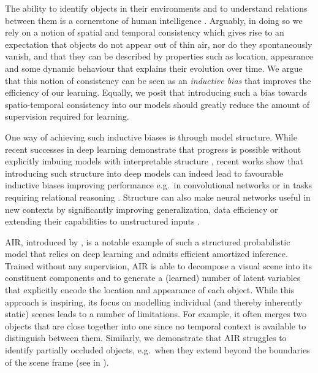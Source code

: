 \label{sec:sqair_intro}

The ability to identify objects in their environments and to understand relations between them is a cornerstone of human intelligence \citep{Kemp2008discovery}. Arguably, in doing so we rely on a notion of spatial and temporal consistency which gives rise to an expectation that objects do not appear out of thin air, nor do they spontaneously vanish, and that they can be described by properties such as location, appearance and some dynamic behaviour that explains their evolution over time. We argue that this notion of consistency can be seen as an \textit{inductive bias} that improves the efficiency of our learning. Equally, we posit that introducing such a bias towards spatio-temporal consistency into our models should greatly reduce the amount of supervision required for learning.

One way of achieving such inductive biases is through model structure. 
While recent successes in deep learning demonstrate that progress is possible without explicitly imbuing models with interpretable structure \citep{Lecun2015deep}, recent works show that introducing such structure into deep models can indeed lead to favourable inductive biases improving performance  e.g.\ in convolutional networks \citep{Lecun1989backpropagation} or in tasks requiring relational reasoning \citep{Santoro2017}.
Structure can also make neural networks useful in new contexts by significantly improving generalization, data efficiency \citep{Jacobsen2016struc} or extending their capabilities to unstructured inputs \citep{Graves2016dnc}.

\gls{AIR}, introduced by \cite{Eslami2016air}, is a notable example of such a structured probabilistic model that relies on deep learning and admits efficient amortized inference.
Trained without any supervision, \gls{AIR} is able to decompose a visual scene into its constituent components and to generate a (learned) number of latent variables that explicitly encode the location and appearance of each object. While this approach is inspiring, its focus on modelling individual (and thereby inherently static) scenes leads to a number of limitations. For example, it often merges two objects that are close together into one since no temporal context is available to distinguish between them. Similarly, we demonstrate that \gls{AIR} struggles to identify partially occluded objects, e.g.\ when they extend beyond the boundaries of the  scene frame (see  in ). 

